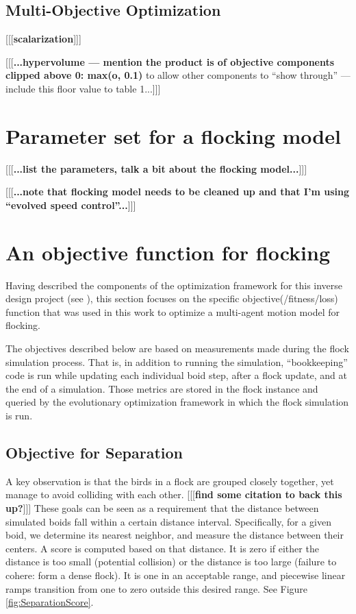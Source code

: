 \documentclass[letterpaper]{article}
\begin{document}
\subsection{Multi-Objective Optimization}
\label{subsec:Multi-Objective}

[[[\textbf{scalarization}]]]

[[[\textbf{...hypervolume --- mention the product is of objective components clipped above 0: max(o, 0.1)} to allow other components to ``show through'' --- include this floor value to table 1...]]]

\section{Parameter set for a flocking model}
\label{sec:parameter_set}

[[[\textbf{...list the parameters, talk a bit about the flocking model...}]]]

[[[\textbf{...note that flocking model needs to be cleaned up and that I'm using ``evolved speed control''...}]]]

\section{An objective function for flocking}
\label{sec:FlockingObjective}

Having described the components of the optimization framework for this inverse design project (see ), this section focuses on the specific objective(/fitness/loss) function that was used in this work to optimize a multi-agent motion model for flocking.

The objectives described below are based on measurements made during the flock simulation process. That is, in addition to running the simulation, ``bookkeeping'' code is run while updating each individual boid step, after a flock update, and at the end of a simulation. Those metrics are stored in the flock instance and queried by the evolutionary optimization framework in which the flock simulation is run.

\subsection{Objective for Separation}
\label{subsec:separation_objective}

A key observation is that the birds in a flock are grouped closely together, yet manage to avoid colliding with each other. [[[\textbf{find some citation to back this up?}]]] These goals can be seen as a requirement that the distance between simulated boids fall within a certain distance interval. Specifically, for a given boid, we determine its nearest neighbor, and measure the distance between their centers. A score is computed based on that distance. It is zero if either the distance is too small (potential collision) or the distance is too large (failure to cohere: form a dense flock). It is one in an acceptable range, and piecewise linear ramps transition from one to zero outside this desired range. See Figure \ref{fig:SeparationScore}.
\end{document}
